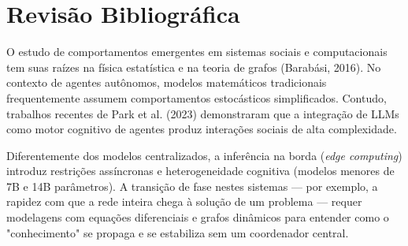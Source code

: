 \chapter{Revisão Bibliográfica}
O estudo de comportamentos emergentes em sistemas sociais e computacionais tem suas raízes na física estatística e na teoria de grafos (Barabási, 2016). No contexto de agentes autônomos, modelos matemáticos tradicionais frequentemente assumem comportamentos estocásticos simplificados. Contudo, trabalhos recentes de Park et al. (2023) demonstraram que a integração de LLMs como motor cognitivo de agentes produz interações sociais de alta complexidade.

Diferentemente dos modelos centralizados, a inferência na borda (\textit{edge computing}) introduz restrições assíncronas e heterogeneidade cognitiva (modelos menores de 7B e 14B parâmetros). A transição de fase nestes sistemas — por exemplo, a rapidez com que a rede inteira chega à solução de um problema — requer modelagens com equações diferenciais e grafos dinâmicos para entender como o "conhecimento" se propaga e se estabiliza sem um coordenador central.
